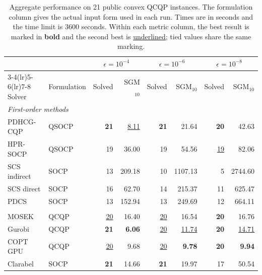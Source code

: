 \documentclass[letterpaper]{article} %
\newcommand{\name}{PDHCG-CQP\xspace}
\theoremstyle{definition}
\theoremstyle{remark}
\newcommand{\papertablesetup}{\small\setstretch{1.0}\renewcommand{\arraystretch}{1.2}}
\begin{document}
\begin{table}[htbp]
    \centering
  \papertablesetup
    \caption{Aggregate performance on 21 public convex QCQP instances. The
    formulation column gives the actual input form used in each run. Times are
    in seconds and the time limit is 3600 seconds. Within each metric column,
    the best result is marked in \textbf{bold} and the second best is
    \underline{underlined}; tied values share the same marking.}
    \label{tab:qcqp-public}
    \medskip
    \begin{tabular}{llrrrrrr}
        \toprule
        & & \multicolumn{2}{c}{$\epsilon=10^{-4}$}
        & \multicolumn{2}{c}{$\epsilon=10^{-6}$}
        & \multicolumn{2}{c}{$\epsilon=10^{-8}$}\\
        \cmidrule(lr){3-4}\cmidrule(lr){5-6}\cmidrule(lr){7-8}
        Solver & Formulation & Solved & SGM$_{10}$ & Solved & SGM$_{10}$ & Solved & SGM$_{10}$\\
        \midrule
        \multicolumn{8}{l}{\textit{First-order methods}}\\
        \name                    & QSOCP & \textbf{21} & \underline{8.11} & \textbf{21} & 21.64 & \textbf{20} & 42.63\\
        HPR-SOCP                  & QSOCP & 19 & 36.00 & 19 & 54.56 & \underline{19} & 82.06\\
        SCS indirect             & SOCP  & 13 & 209.18 & 10 & 1107.13 & 5 & 2744.60\\
        SCS direct               & SOCP  & 16 & 62.70 & 14 & 215.37 & 11 & 625.47\\
        PDCS                     & SOCP  & 13 & 152.94 & 13 & 249.69 & 12 & 664.11\\
        \addlinespace
        \multicolumn{8}{l}{\textit{Interior-point methods}}\\
        MOSEK                    & QCQP  & \underline{20} & 16.40 & \underline{20} & 16.54 & \textbf{20} & 16.76\\
        Gurobi                   & QCQP  & \textbf{21} & \textbf{6.06} & \underline{20} & \underline{11.74} & \textbf{20} & \underline{14.71}\\
        COPT GPU                 & QCQP  & \underline{20} & 9.68 & \underline{20} & \textbf{9.78} & \textbf{20} & \textbf{9.94}\\
        Clarabel                 & SOCP  & \textbf{21} & 14.66 & \textbf{21} & 19.97 & 17 & 50.54\\
        \bottomrule
    \end{tabular}
\end{table}
\end{document}
